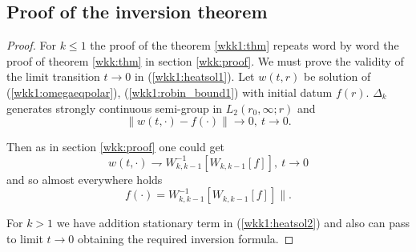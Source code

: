 \documentclass[manuscript, printscheme]{paper}
\begin{document}
\subsection{Proof of the inversion theorem }
\begin{proof}

For $k\leq 1$ the proof of the theorem \ref{wkk1:thm} repeats word by word the proof of theorem \ref{wkk:thm} in section \ref{wkk:proof}. We must prove the validity of the limit transition $t\to 0$ in (\ref{wkk1:heatsol1}). Let $w(t,r)$ be solution of (\ref{wkk1:omegaeqpolar}), (\ref{wkk1:robin_bound1}) with initial datum $f(r)$. $\Delta_k$ generates strongly continuous semi-group in $L_2(r_0,\infty; r)$ and 
$$
\|w(t,\cdot) - f(\cdot)\| \to 0,~t\to 0.
$$ 

Then as in section \ref{wkk:proof} one could get
$$
w(t,\cdot) \rightharpoondown W^{-1}_{k,k-1}\left [W_{k,k-1} [f] \right ],~t\to 0
$$
and so almost everywhere holds
$$f(\cdot)=W^{-1}_{k,k-1}\left [W_{k,k-1} [f] \right ]\|.$$

For $k>1$ we have addition stationary term in (\ref{wkk1:heatsol2}) and also can pass to limit $t\to 0$ obtaining the required inversion formula.
\end{proof}


%
%
\end{document}
